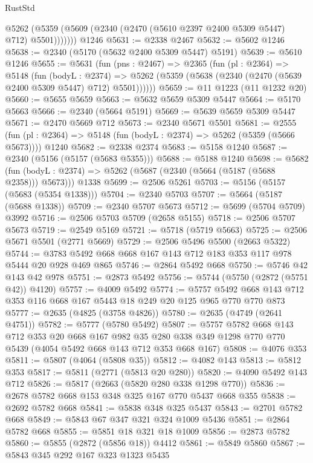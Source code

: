 \begin{lexlean}{RustStd}
\begin{coremodule}
          @5262 (@5359 (@5609 (@2340 (@2470 (@5610 @2397 @2400 @5309 @5447) @712) @5501)))))))
    @1246
@5631 := @2338 @2467
@5632 := @5602 @1246
@5638 := @2340 (@5170 (@5632 @2400 @5309 @5447) @5191)
@5639 := @5610 @1246
@5655 := @5631
    (fun (pns : @2467) =>
    @2365
      (fun (pl : @2364) =>
      @5148
        (fun (bodyL : @2374) =>
        @5262 (@5359 (@5638 (@2340 (@2470 (@5639 @2400 @5309 @5447) @712) @5501))))))
@5659 := @11 @1223 (@11 @1232 @20)
@5660 := @5655 @5659
@5663 := @5632 @5659 @5309 @5447
@5664 := @5170 @5663
@5666 := @2340 (@5664 @5191)
@5669 := @5639 @5659 @5309 @5447
@5671 := @2470 @5669 @712
@5673 := @2340 @5671 @5501
@5681 := @2555
    (fun (pl : @2364) => @5148 (fun (bodyL : @2374) => @5262 (@5359 (@5666 @5673))))
    @1240
@5682 := @2338 @2374
@5683 := @5158 @1240
@5687 := @2340 (@5156 (@5157 (@5683 @5355)))
@5688 := @5188 @1240
@5698 := @5682
    (fun (bodyL : @2374) => @5262 (@5687 (@2340 (@5664 (@5187 (@5688 @2358))) @5673)))
    @1338
@5699 := @2506 @5261
@5703 := @5156 (@5157 (@5683 (@5354 @1338)))
@5704 := @2340 @5703
@5707 := @5664 (@5187 (@5688 @1338))
@5709 := @2340 @5707 @5673
@5712 := @5699 (@5704 @5709) @3992
@5716 := @2506 @5703 @5709 (@2658 @5155)
@5718 := @2506 @5707 @5673
@5719 := @2549 @5169
@5721 := @5718 (@5719 @5663)
@5725 := @2506 @5671 @5501 (@2771 @5669)
@5729 := @2506 @5496 @5500 (@2663 @5322)
@5744 := @3783 @5492 @668 @668 @167 @143 @712 @183 @353 @117 @978 @5444 @20 @928 @469 @865
@5746 := @2864 @5492 @668
@5750 := @5746 @42 @143 @42 @978
@5751 := @2873 @5492
@5756 := @5744 (@5750 (@2872 (@5751 @42)) @4120)
@5757 := @4009 @5492
@5774 := @5757 @5492 @668 @143 @712 @353 @116 @668 @167 @5443 @18 @249 @20 @125 @965 @770 @770 @873
@5777 := @2635 (@4825 (@3758 @4826))
@5780 := @2635 (@4749 (@2641 @4751))
@5782 := @5777 (@5780 @5492)
@5807 := @5757
    @5782
    @668
    @143
    @712
    @353
    @20
    @668
    @167
    @982
    @35
    @280
    @338
    @349
    @1298
    @770
    @770
    @5439
    (@4054 @5492 @668 @143 @712 @353 @668 @167)
@5808 := @4076 @353
@5811 := @5807 (@4064 (@5808 @35))
@5812 := @4082 @143
@5813 := @5812 @353
@5817 := @5811 (@2771 (@5813 @20 @280))
@5820 := @4090 @5492 @143 @712
@5826 := @5817 (@2663 (@5820 @280 @338 @1298 @770))
@5836 := @2678 @5782 @668 @153 @348 @325 @167 @770 @5437 @668 @355
@5838 := @2692 @5782 @668
@5841 := @5838 @348 @325 @5437
@5843 := @2701 @5782 @668
@5849 := @5843 @67 @347 @321 @324 @1009 @5436
@5851 := @2864 @5782 @668
@5855 := @5851 @18 @321 @18 @1009
@5856 := @2873 @5782
@5860 := @5855 (@2872 (@5856 @18)) @4412
@5861 := @5849 @5860
@5867 := @5843 @345 @292 @167 @323 @1323 @5435

\end{coremodule}
\end{lexlean}

